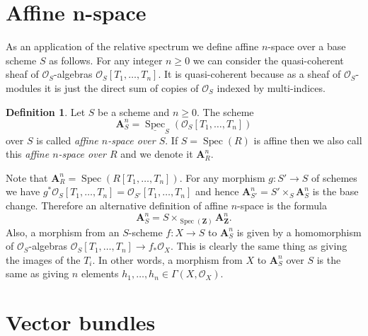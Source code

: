 \documentclass{stacks-project}
\theoremstyle{plain}
\theoremstyle{definition}
\newtheorem{definition}[subsection]{Definition}
\theoremstyle{remark}
\numberwithin{equation}{subsection}
\def\Spec{\mathop{\mathrm{Spec}}}
\begin{document}
\section{Affine n-space}
\label{section-affine-n-space}

\noindent
As an application of the relative spectrum
we define affine $n$-space over a base scheme
$S$ as follows. For any integer $n \geq 0$ we can consider the
quasi-coherent sheaf of $\mathcal{O}_S$-algebras
$\mathcal{O}_S[T_1, \ldots, T_n]$. It is quasi-coherent because
as a sheaf of $\mathcal{O}_S$-modules it is just the direct sum
of copies of $\mathcal{O}_S$ indexed by multi-indices.

\begin{definition}
\label{definition-affine-n-space}
Let $S$ be a scheme and $n \geq 0$.
The scheme
$$
\mathbf{A}^n_S =
\underline{\Spec}_S(\mathcal{O}_S[T_1, \ldots, T_n])
$$
over $S$ is called {\it affine $n$-space over $S$}.
If $S = \Spec(R)$ is affine then we also call this
{\it affine $n$-space over $R$} and we denote it $\mathbf{A}^n_R$.
\end{definition}

\noindent
Note that $\mathbf{A}^n_R = \Spec(R[T_1, \ldots, T_n])$.
For any morphism $g : S' \to S$ of schemes we have
$g^*\mathcal{O}_S[T_1, \ldots, T_n] = \mathcal{O}_{S'}[T_1, \ldots, T_n]$
and hence $\mathbf{A}^n_{S'} = S' \times_S \mathbf{A}^n_S$ is the base
change. Therefore an alternative definition of affine $n$-space
is the formula
$$
\mathbf{A}^n_S = S \times_{\Spec(\mathbf{Z})} \mathbf{A}^n_{\mathbf{Z}}.
$$
Also, a morphism from an $S$-scheme $f : X \to S$
to $\mathbf{A}^n_S$ is given by a homomorphism of
$\mathcal{O}_S$-algebras
$\mathcal{O}_S[T_1, \ldots, T_n] \to f_*\mathcal{O}_X$.
This is clearly the same thing as giving the images of the $T_i$.
In other words, a morphism from $X$ to $\mathbf{A}^n_S$ over $S$
is the same as giving $n$ elements
$h_1, \ldots, h_n \in \Gamma(X, \mathcal{O}_X)$.

















\section{Vector bundles}
\label{section-vector-bundle}
\end{document}
